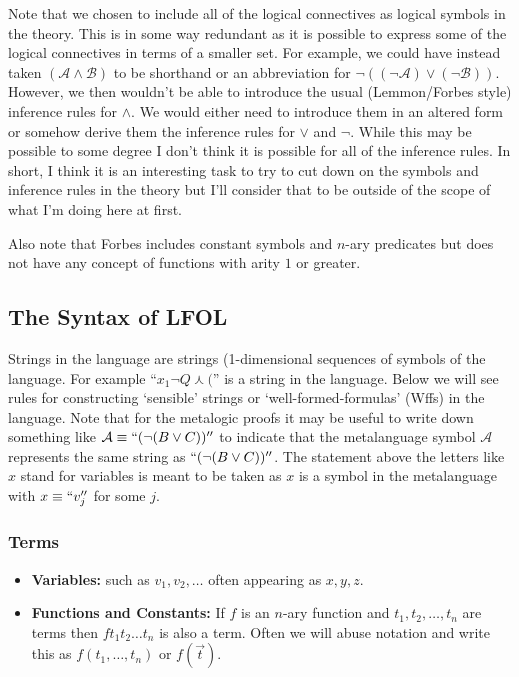 \documentclass[12pt]{article}
\newcommand{\mc}[1]{\mathcal{#1}}
\begin{document}
Note that we chosen to include all of the logical connectives as logical symbols in the theory. This is in some way redundant as it is possible to express some of the logical connectives in terms of a smaller set. For example, we could have instead taken $(\mc{A} \land \mc{B})$ to be shorthand or an abbreviation for $\lnot((\lnot\mc{A})\lor(\lnot \mc{B}))$. However, we then wouldn't be able to introduce the usual (Lemmon/Forbes style) inference rules for $\land$. We would either need to introduce them in an altered form or somehow derive them the inference rules for $\lor$ and $\lnot$.  While this may be possible to some degree I don't think it is possible for all of the inference rules. In short, I think it is an interesting task to try to cut down on the symbols and inference rules in the theory but I'll consider that to be outside of the scope of what I'm doing here at first.

Also note that Forbes includes constant symbols and $n$-ary predicates but does not have any concept of functions with arity $1$ or greater.

\subsection*{The Syntax of LFOL}

Strings in the language are strings (1-dimensional sequences of symbols of the language. For example ``$x_1 \lnot Q \curlywedge ($'' is a string in the language. Below we will see rules for constructing `sensible' strings or `well-formed-formulas' (Wffs) in the language. Note that for the metalogic proofs it may be useful to write down something like $\mc{A} \equiv ``(\lnot(B\lor C))''$ to indicate that the metalanguage symbol $\mc{A}$ represents the same string as $``(\lnot(B \lor C))''$. The statement above the letters like $x$ stand for variables is meant to be taken as $x$ is a symbol in the metalanguage with $x \equiv ``v_j''$ for some $j$.

\hrulefill
\subsubsection*{Terms}
\begin{itemize}
\item{\textbf{Variables:} such as $v_1, v_2,\ldots$ often appearing as $x,y,z$.}
\item{\textbf{Functions and Constants:} If $f$ is an $n$-ary function and $t_1,t_2,\ldots, t_n$ are terms then $ft_1t_2\ldots t_n$ is also a term. Often we will abuse notation and write this as $f(t_1,
\ldots,t_n)$ or $f(\vec{t})$.}
\end{itemize}
\end{document}
